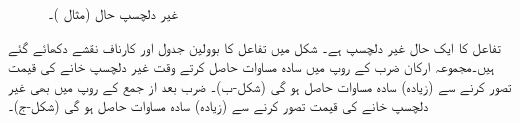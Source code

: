 \begin{figure}
\begin{subfigure}{0.33\textwidth}
\caption{}
\end{subfigure}\hfill
\begin{subfigure}{0.33\textwidth}
\centering
{}
\caption{}
\end{subfigure}
\caption{غیر دلچسپ حال (مثال )۔}
\label{شکل_بوولین_غیر_دلچسپ_پہلا}
\end{figure}
\quad
 تفاعل کا ایک حال غیر دلچسپ ہے۔ شکل  میں تفاعل کا بوولین جدول اور کارناف نقشے دکھائے گئے ہیں۔مجموعہ ارکان ضرب کے روپ میں سادہ مساوات حاصل کرتے وقت غیر دلچسپ خانے کی قیمت  تصور کرنے سے (زیادہ) سادہ مساوات حاصل ہو گی (شکل-ب)۔  ضرب بعد از جمع کے روپ میں بھی غیر دلچسپ خانے کی قیمت  تصور کرنے سے (زیادہ) سادہ مساوات حاصل ہو گی (شکل-ج)۔
